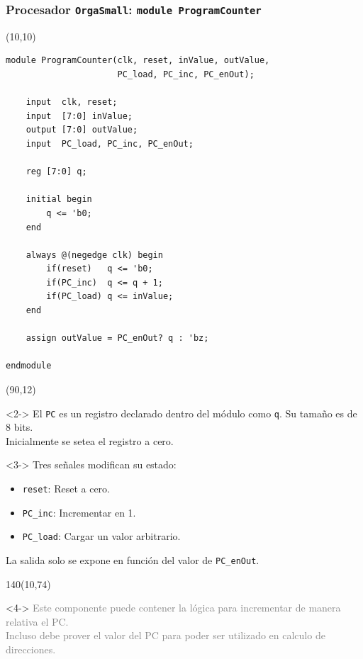\documentclass[aspectratio=169]{beamer}
\begin{document}
\begin{frame}[fragile,t]
    \frametitle{Procesador \texttt{OrgaSmall}: \texttt{module ProgramCounter}}
    \begin{textblock}{70}(10,10)
\lstset{basicstyle=\tiny}
\begin{lstlisting}
module ProgramCounter(clk, reset, inValue, outValue,
                      PC_load, PC_inc, PC_enOut);

    input  clk, reset;
    input  [7:0] inValue;
    output [7:0] outValue;
    input  PC_load, PC_inc, PC_enOut;
    
    reg [7:0] q;
    
    initial begin
        q <= 'b0;
    end
    
    always @(negedge clk) begin
        if(reset)   q <= 'b0;
        if(PC_inc)  q <= q + 1;
        if(PC_load) q <= inValue;
    end
    
    assign outValue = PC_enOut? q : 'bz;
    
endmodule
\end{lstlisting}
    \end{textblock}
    \begin{textblock}{57}(90,12)
    \small
    \begin{onlyenv}<2->
    El \texttt{PC} es un registro declarado dentro del módulo como \texttt{q}.
    Su tamaño es de 8 bits.\\
    \bigskip
    \textcolor{verdeuca}{Inicialmente se setea el registro a cero.}\\
    \end{onlyenv}
    \bigskip
    \begin{onlyenv}<3->
    Tres señales modifican su estado:\\
    \begin{itemize}
    \setlength\itemsep{0cm}
     \item \texttt{reset}: Reset a cero.
     \item \texttt{PC\_inc}: Incrementar en 1.
     \item \texttt{PC\_load}: Cargar un valor arbitrario.
    \end{itemize}
    \bigskip
    La salida solo se expone en función del valor de \texttt{PC\_enOut}.
    \end{onlyenv}
    \end{textblock}
    \begin{textblock}{140}(10,74)
    \small
    \begin{onlyenv}<4->
    \textcolor{gray}{
    Este componente puede contener la lógica para incrementar de manera relativa el PC.\\
    Incluso debe prover el valor del PC para poder ser utilizado en calculo de direcciones.}
    \end{onlyenv}
    \end{textblock}
\end{frame}
\end{document}
